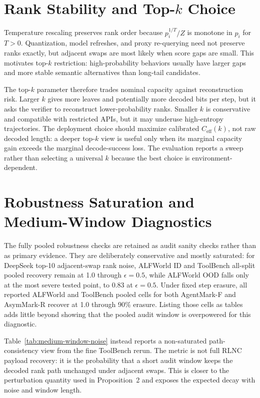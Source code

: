 \documentclass[conference,compsoc]{IEEEtran}
\newcommand{\ours}{AsymMark-R}
\newcommand{\agentmark}{AgentMark-F}
\newcommand{\Ceff}{\ensuremath{C_{\mathrm{eff}}}}
\begin{document}
\section{Rank Stability and Top-\texorpdfstring{$k$}{k} Choice}
\label{app:rank-stability}

Temperature rescaling preserves rank order because $p_i^{1/T}/Z$ is monotone in $p_i$ for $T>0$. Quantization, model refreshes, and proxy re-querying need not preserve ranks exactly, but adjacent swaps are most likely when score gaps are small. This motivates top-$k$ restriction: high-probability behaviors usually have larger gaps and more stable semantic alternatives than long-tail candidates.

The top-$k$ parameter therefore trades nominal capacity against reconstruction risk. Larger $k$ gives more leaves and potentially more decoded bits per step, but it asks the verifier to reconstruct lower-probability ranks. Smaller $k$ is conservative and compatible with restricted APIs, but it may underuse high-entropy trajectories. The deployment choice should maximize calibrated $\Ceff(k)$, not raw decoded length: a deeper top-$k$ view is useful only when its marginal capacity gain exceeds the marginal decode-success loss. The evaluation reports a sweep rather than selecting a universal $k$ because the best choice is environment-dependent.

\section{Robustness Saturation and Medium-Window Diagnostics}
\label{app:robustness-diagnostics}

The fully pooled robustness checks are retained as audit sanity checks rather than as primary evidence. They are deliberately conservative and mostly saturated: for DeepSeek top-10 adjacent-swap rank noise, ALFWorld ID and ToolBench all-split pooled recovery remain at 1.0 through $\epsilon=0.5$, while ALFWorld OOD falls only at the most severe tested point, to 0.83 at $\epsilon=0.5$. Under fixed step erasure, all reported ALFWorld and ToolBench pooled cells for both \agentmark{} and \ours{} recover at 1.0 through 90\% erasure. Listing those cells as tables adds little beyond showing that the pooled audit window is overpowered for this diagnostic.

Table~\ref{tab:medium-window-noise} instead reports a non-saturated path-consistency view from the fine ToolBench rerun. The metric is not full RLNC payload recovery: it is the probability that a short audit window keeps the decoded rank path unchanged under adjacent swaps. This is closer to the perturbation quantity used in Proposition~2 and exposes the expected decay with noise and window length.
\end{document}

